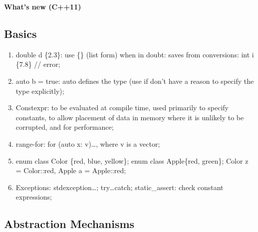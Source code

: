 \documentclass{article}
\begin{document}
\begin{center}
  \LARGE{\bf{What's new (C++11)}}
\end{center}

\subsection*{Basics}

\begin{enumerate}

  \item double d \{2.3\}: use \{\} (list form) when in doubt: saves from
    conversions:
    int i \{7.8\} // error;

  \item auto b = true: auto defines the type (use if don't have a reason to
    specify the type explicitly);

  \item Constexpr: to be evaluated at compile time, used primarily to specify
    constants, to allow placement of data in memory where it is unlikely to be
    corrupted, and for performance;

  \item range-for: for (auto x: v)\ldots, where v is a vector;

  \item enum class Color \{red, blue, yellow\}; enum class Apple\{red, green\};
    Color z = Color::red, Apple a = Apple::red;

  \item Exceptions: stdexception\ldots; try\ldots catch; static\_assert: check
    constant expressions;

\end{enumerate}

\subsection*{Abstraction Mechanisms}
\end{document}
